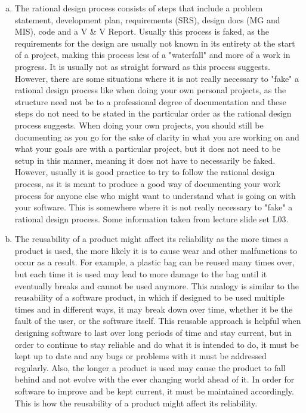\documentclass[12pt]{article}
\begin{document}
\begin{enumerate}[(a)]
\item The rational design process consists of steps that include a problem 
statement, development plan, requirements (SRS), design docs (MG and MIS), 
code and a V \& V Report. Usually this process is faked, as the requirements 
for the design are usually not known in its entirety at the start of a project, 
making this process less of a "waterfall" and more of a work in progress. It 
is usually not as straight forward as this process suggests. However, there 
are some situations where it is not really necessary to "fake" a rational design 
process like when doing your own personal projects, as the structure need not 
be to a professional degree of documentation and these steps do not need to be 
stated in the particular order as the rational design process suggests. When 
doing your own projects, you should still be documenting as you go for the 
sake of clarity in what you are working on and what your goals are with a 
particular project, but it does not need to be setup in this manner, meaning 
it does not have to necessarily be faked. However, usually it is good practice 
to try to follow the rational design process, as it is meant to produce a good 
way of documenting your work process for anyone else who might want  to 
understand what is going on with your software. This is somewhere where it 
is not really necessary to "fake" a rational design process. Some information 
taken from lecture slide set L03. 
 
\item The reusability of a product might affect its reliability as the more times 
a product is used, the more likely it is to cause wear and other malfunctions 
to occur as a result. For example, a plastic bag can be reused many times over, 
but each time it is used may lead to more damage to the bag until it eventually 
breaks and cannot be used anymore. This analogy is similar to the reusability 
of a software product, in which if designed to be used multiple times and in 
different ways, it may break down over time, whether it be the fault of the 
user, or the software itself. This reusable approach is helpful when designing 
software to last over long periods of time and stay current, but in order to 
continue to stay reliable and do what it is intended to do, it must be kept 
up to date and any bugs or problems with it must be addressed regularly. Also, 
the longer a product is used may cause the product to fall behind and not evolve 
with the ever changing world ahead of it. In order for software to improve and be 
kept current, it must be maintained accordingly. This is how the reusability of a 
product might affect its reliability. 


\end{enumerate}
\end{document}
